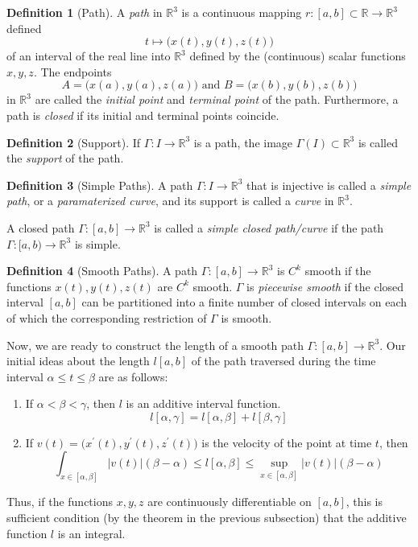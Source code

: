 \documentclass{article}
\theoremstyle{remark}
\theoremstyle{definition}
\newtheorem{definition}{Definition}[section]
\begin{document}
\begin{definition}[Path]
A \textit{path} in $\mathbb{R}^3$ is a continuous mapping $r: [a, b] \subset \mathbb{R} \longrightarrow \mathbb{R}^3$ defined
\[t \mapsto \big(x(t), y(t), z(t)\big)\]
of an interval of the real line into $\mathbb{R}^3$ defined by the (continuous) scalar functions $x, y, z$. The endpoints 
\[A = \big(x(a), y(a), z(a)\big) \text{ and } B = \big(x(b), y(b), z(b)\big)\]
in $\mathbb{R}^3$ are called the \textit{initial point} and \textit{terminal point} of the path. Furthermore, a path is \textit{closed} if its initial and terminal points coincide. 
\end{definition}

\begin{definition}[Support]
If $\Gamma: I \longrightarrow \mathbb{R}^3$ is a path, the image $\Gamma(I) \subset \mathbb{R}^3$ is called the \textit{support} of the path. 
\end{definition}

\begin{definition}[Simple Paths]
A path $\Gamma: I \longrightarrow \mathbb{R}^3$ that is injective is called a \textit{simple path}, or a \textit{paramaterized curve}, and its support is called a \textit{curve} in $\mathbb{R}^3$. 

A closed path $\Gamma: [a, b] \longrightarrow \mathbb{R}^3$ is called a \textit{simple closed path/curve} if the path $\Gamma: [a, b) \longrightarrow \mathbb{R}^3$ is simple. 
\end{definition}

\begin{definition}[Smooth Paths]
A path $\Gamma: [a, b] \longrightarrow \mathbb{R}^3$ is $C^k$ smooth if the functions $x(t), y(t), z(t)$ are $C^k$ smooth. $\Gamma$ is \textit{piecewise smooth} if the closed interval $[a, b]$ can be partitioned into a finite number of closed intervals on each of which the corresponding restriction of $\Gamma$ is smooth. 
\end{definition}

Now, we are ready to construct the length of a smooth path $\Gamma: [a, b] \longrightarrow \mathbb{R}^3$. Our initial ideas about the length $l[a, b]$ of the path traversed during the time interval $\alpha \leq t \leq \beta$ are as follows: 
\begin{enumerate}
    \item If $\alpha < \beta < \gamma$, then $l$ is an additive interval function.
    \[l[\alpha, \gamma] = l[\alpha, \beta] + l[\beta, \gamma]\]
    \item If $v(t) = \big( x^\prime (t), y^\prime (t), z^\prime (t)\big)$ is the velocity of the point at time $t$, then 
    \[\int_{x \in [\alpha, \beta]} |v(t)| (\beta - \alpha) \leq l[\alpha, \beta] \leq \sup_{x \in [\alpha, \beta]} |v(t)| (\beta - \alpha)\]
\end{enumerate}
Thus, if the functions $x, y, z$ are continuously differentiable on $[a, b]$, this is sufficient condition (by the theorem in the previous subsection) that the additive function $l$ is an integral.
\end{document}
